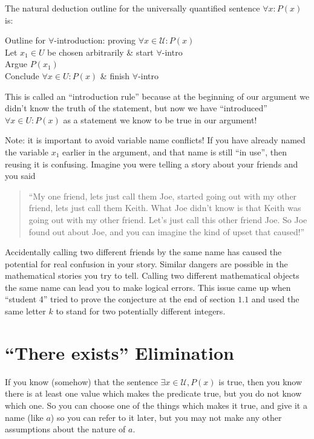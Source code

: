 The natural deduction outline for the universally quantified sentence  $\forall x: P(x)$ is:

\begin{fitch*}
	\textrm{Outline for $\forall$-introduction:  proving $\forall x \in \mathcal{U}: P(x)$}\\
	\hspace{1 cm}\textrm{Let $x_1 \in U$ be chosen arbitrarily} & start $\forall$-intro\\
	\hspace{1 cm}\textrm{Argue $P(x_1)$}\\
	\hspace{1 cm}\textrm{Conclude $\forall x \in U:  P(x)$} & finish $\forall$-intro
\end{fitch*}

This is called an ``introduction rule'' because at the beginning of our argument we didn't know the truth of the statement, but now we have ``introduced'' $\forall x \in U:  P(x)$ as a statement we know to be true in our argument!

Note:  it is important to avoid variable name conflicts!  If you have already named the variable $x_1$ earlier in the argument, and that name is still ``in use'', then reusing it is confusing.  Imagine you were telling a story about your friends and you said

\begin{quote}
``My one friend, lets just call them Joe, started going out with my other friend, lets just call them Keith.  What Joe didn't know is that Keith was going out with my other friend.  Let's just call this other friend Joe.  So Joe found out about Joe, and you can imagine the kind of upset that caused!''
\end{quote}

Accidentally calling two different friends by the same name has caused the potential for real confusion in your story.  Similar dangers are possible in the mathematical stories you try to tell.  Calling two different mathematical objects the same name can lead you to make logical errors.  This issue came up when ``student 4'' tried to prove the conjecture at the end of section $1.1$ and used the same letter $k$ to stand for two potentially different integers.

\section{``There exists'' Elimination}

If you know (somehow) that the sentence $\exists x \in \mathcal{U}, P(x)$ is true, then you know there is at least one value which makes the predicate true, but you do not know which one.  So you can choose one of the things which makes it true, and give it a name (like $a$) so you can refer to it later, but you may not make any other assumptions about the nature of $a$. 

